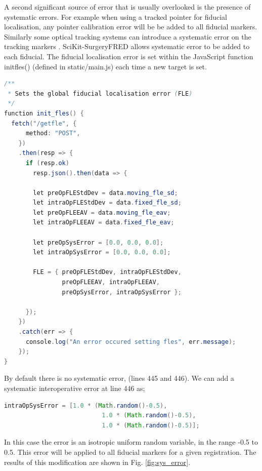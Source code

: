 A second significant source of error that is usually overlooked is the presence of systematic errors. For example when using a tracked pointer for fiducial localisation, 
any pointer calibration error will be be added to all fiducial markers.
Similarly some optical tracking systems can introduce a systematic error on 
the tracking markers \cite{6294449}. {SciKit-SurgeryFRED} allows systematic error to 
be added to each fiducial. The fiducial localisation error is set within 
the JavaScript function init{\textunderscore}fles()
(defined in static/main.js) each time a new target is set. 
\begin{lstlisting}[language=java, firstnumber = 429]
/**
 * Sets the global fiducial localisation error (FLE)
 */
function init_fles() {
  fetch("/getfle", {
      method: "POST",
    })
    .then(resp => {
      if (resp.ok)
        resp.json().then(data => {

        let preOpFLEStdDev = data.moving_fle_sd;
        let intraOpFLEStdDev = data.fixed_fle_sd;
        let preOpFLEEAV = data.moving_fle_eav;
        let intraOpFLEEAV = data.fixed_fle_eav;

        let preOpSysError = [0.0, 0.0, 0.0];
        let intraOpSysError = [0.0, 0.0, 0.0];

        FLE = { preOpFLEStdDev, intraOpFLEStdDev,
                preOpFLEEAV, intraOpFLEEAV,
                preOpSysError, intraOpSysError };

      });
    })
    .catch(err => {
      console.log("An error occured setting fles", err.message);
    });
}
\end{lstlisting}
By default there is no systematic error, (lines 445 and 446). We can 
add a systematic interoperative error at line 446 as; 

\begin{lstlisting}[language=java, firstnumber = 446]
        intraOpSysError = [1.0 * (Math.random()-0.5), 
                           1.0 * (Math.random()-0.5), 
                           1.0 * (Math.random()-0.5)];
\end{lstlisting}

In this case the error is an isotropic uniform random variable, in the range
-0.5 to 0.5. This error will be applied to all fiducial markers for a 
given registration. The results of this modification are shown in Fig. \ref{fig:sys_error}.

